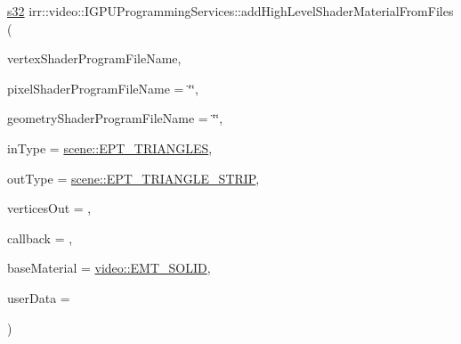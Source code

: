 {\footnotesize\ttfamily \hyperlink{namespaceirr_ac66849b7a6ed16e30ebede579f9b47c6}{s32} irr\+::video\+::\+I\+G\+P\+U\+Programming\+Services\+::add\+High\+Level\+Shader\+Material\+From\+Files (\begin{DoxyParamCaption}\item[{const \hyperlink{namespaceirr_1_1io_ab1bdc45edb3f94d8319c02bc0f840ee1}{io\+::path} \&}]{vertex\+Shader\+Program\+File\+Name,  }\item[{const \hyperlink{namespaceirr_1_1io_ab1bdc45edb3f94d8319c02bc0f840ee1}{io\+::path} \&}]{pixel\+Shader\+Program\+File\+Name = {\ttfamily \char`\"{}\char`\"{}},  }\item[{const \hyperlink{namespaceirr_1_1io_ab1bdc45edb3f94d8319c02bc0f840ee1}{io\+::path} \&}]{geometry\+Shader\+Program\+File\+Name = {\ttfamily \char`\"{}\char`\"{}},  }\item[{\hyperlink{namespaceirr_1_1scene_a5d7de82f2169761194b2f44d95cdc1dc}{scene\+::\+E\+\_\+\+P\+R\+I\+M\+I\+T\+I\+V\+E\+\_\+\+T\+Y\+PE}}]{in\+Type = {\ttfamily \hyperlink{namespaceirr_1_1scene_a5d7de82f2169761194b2f44d95cdc1dca237fc76e4b259febd27b4b84066ca581}{scene\+::\+E\+P\+T\+\_\+\+T\+R\+I\+A\+N\+G\+L\+ES}},  }\item[{\hyperlink{namespaceirr_1_1scene_a5d7de82f2169761194b2f44d95cdc1dc}{scene\+::\+E\+\_\+\+P\+R\+I\+M\+I\+T\+I\+V\+E\+\_\+\+T\+Y\+PE}}]{out\+Type = {\ttfamily \hyperlink{namespaceirr_1_1scene_a5d7de82f2169761194b2f44d95cdc1dcaef19e8b586de395af81c8cd9851a1b40}{scene\+::\+E\+P\+T\+\_\+\+T\+R\+I\+A\+N\+G\+L\+E\+\_\+\+S\+T\+R\+IP}},  }\item[{\hyperlink{namespaceirr_a0416a53257075833e7002efd0a18e804}{u32}}]{vertices\+Out = {},  }\item[{\hyperlink{classirr_1_1video_1_1IShaderConstantSetCallBack}{I\+Shader\+Constant\+Set\+Call\+Back} $\ast$}]{callback = {},  }\item[{\hyperlink{namespaceirr_1_1video_ac8e9b6c66f7cebabd1a6d30cbc5430f1}{E\+\_\+\+M\+A\+T\+E\+R\+I\+A\+L\+\_\+\+T\+Y\+PE}}]{base\+Material = {\ttfamily \hyperlink{namespaceirr_1_1video_ac8e9b6c66f7cebabd1a6d30cbc5430f1a9bc471b9c18c9e2d20496004d2a2e803}{video\+::\+E\+M\+T\+\_\+\+S\+O\+L\+ID}},  }\item[{\hyperlink{namespaceirr_ac66849b7a6ed16e30ebede579f9b47c6}{s32}}]{user\+Data = {} }\end{DoxyParamCaption})\hspace{0.3cm}{\ttfamily [inline]}}



